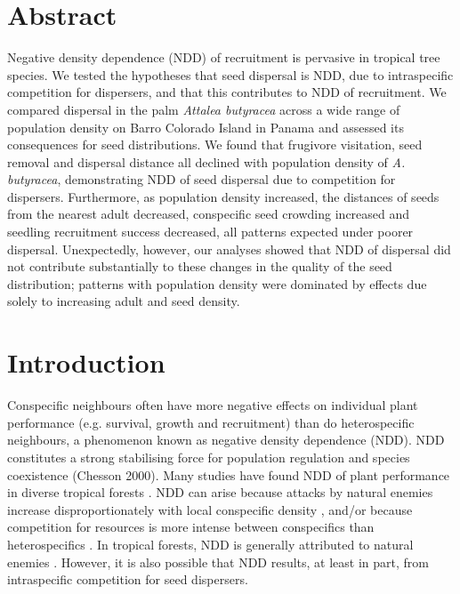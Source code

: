 \documentclass[b5paper,justified]{tufte-book} %
\begin{document}
\section{Abstract} 
\begin{fullwidth}
Negative density dependence (NDD) of recruitment is pervasive in tropical tree species. We tested the hypotheses that seed dispersal is NDD, due to intraspecific competition for dispersers, and that this contributes to NDD of recruitment. We compared dispersal in the palm \textit{Attalea butyracea} across a wide range of population density on Barro Colorado Island in Panama and assessed its consequences for seed distributions. We found that frugivore visitation, seed removal and dispersal distance all declined with population density of \textit{A. butyracea}, demonstrating NDD of seed dispersal due to competition for dispersers. Furthermore, as population density increased, the distances of seeds from the nearest adult decreased, conspecific seed crowding increased and seedling recruitment success decreased, all patterns expected under poorer dispersal. Unexpectedly, however, our analyses showed that NDD of dispersal did not contribute substantially to these changes in the quality of the seed distribution; patterns with population density were dominated by effects due solely to increasing adult and seed density.


\section{Introduction}
Conspecific neighbours often have more negative effects on individual plant performance (e.g. survival, growth and
recruitment) than do heterospecific neighbours, a phenomenon known as negative density dependence (NDD). NDD constitutes a strong stabilising force for population regulation and species coexistence (Chesson 2000). Many studies have found NDD of plant performance in diverse tropical forests \citep{Wright2002}. NDD can arise because attacks by natural enemies increase disproportionately with local conspecific density \citep{Janzen1970, Connell1971}, and/or because competition for resources is more intense between conspecifics than heterospecifics \citep[e.g.][]{Tilman1996}. In tropical forests, NDD is generally attributed to natural enemies \citep{Hammond1998, Terborgh2012}. However, it is also possible that NDD results, at least in part, from intraspecific competition for seed dispersers. 


\end{fullwidth}
\end{document}
